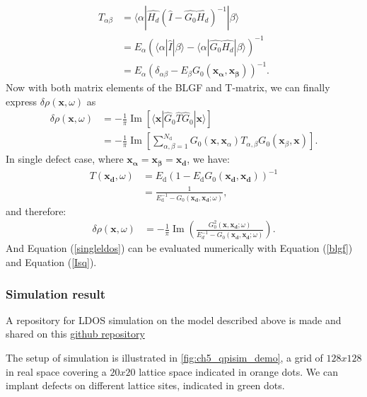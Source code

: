\begin{align}
	T_{\alpha\beta} &= \langle \alpha|\hat{H_d} (\hat{I} - \hat{G_0}\hat{H_d})^{-1} | \beta\rangle \\
	&= E_\alpha(\langle \alpha|\hat{I}|\beta\rangle - \langle \alpha|\hat{G_0}\hat{H_d}|\beta \rangle)^{-1} \\
	&= E_\alpha(\delta_{\alpha \beta} - E_\beta G_0(\mathbf{x_\alpha},\mathbf{x_\beta}))^{-1} \label{T_matrix_ele}.
\end{align}
Now with both matrix elements of the \ac{BLGF} and T-matrix, we can finally express $\delta\rho(\mathbf{x},\omega)$ as 
\begin{align}
	\delta\rho(\mathbf{x},\omega) &= - \frac{1}{\pi} \operatorname{Im} \left[ \langle \mathbf{x} | \hat{G}_0 \hat{T} \hat{G}_0 | \mathbf{x} \rangle \right] \\
	&= -\frac{1}{\pi} \operatorname{Im} \left[\sum_{\alpha, \beta=1}^{N_{\text{d}}} G_0(\mathbf{x}, \mathbf{x}_\alpha) T_{\alpha, \beta} G_0(\mathbf{x}_\beta, \mathbf{x})\right].
\end{align}
In single defect case, where $\mathbf{x_\alpha} = \mathbf{x_\beta} = \mathbf{x_d}$, we have: 
\begin{align}
	T(\mathbf{x_d},\omega) &= E_{\text{d}} \left( 1 - E_{\text{d}} G_0(\mathbf{x_d}, \mathbf{x_d}) \right)^{-1} \label{T_matrix_ele} \\
	&= \frac{1}{E_{\text{d}}^{-1} - G_0(\mathbf{x_d}, \mathbf{x_d}; \omega)},
\end{align}
and therefore: 
\begin{align}
	\delta\rho(\mathbf{x},\omega) &= - \frac{1}{\pi} \operatorname{Im}(\frac{G_0^2(\mathbf{x},\mathbf{x_d};\omega)}{E_d^{-1} - G_0(\mathbf{x_d},\mathbf{x_d};\omega)}) \label{singleldos}. 
\end{align}
And Equation (\ref{singleldos}) can be evaluated numerically with Equation (\ref{blgf}) and Equation (\ref{Isq}).

\subsubsection{Simulation result}
A repository for \ac{LDOS} simulation on the model described above is made and shared on this \hyperlink{https://github.com/Plswearpants/QPI_simulation}{github repository}

The setup of simulation is illustrated in \ref{fig:ch5_qpisim_demo}, a grid of $128x128$ in real space covering a $20x20$ lattice space indicated in orange dots. We can implant defects on different lattice sites, indicated in green dots. 

